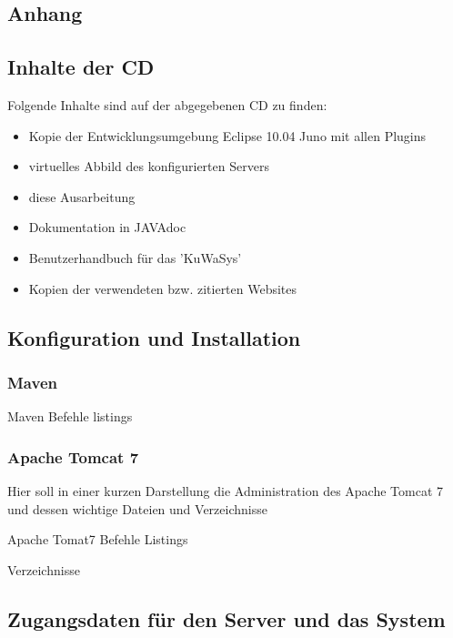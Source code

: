\documentclass[12pt, twoside, a4paper, ngerman]{article}
\begin{document}
\begin{appendix}
\section{Anhang}\label{sec:Anhang}

\subsection{Inhalte der CD}
Folgende Inhalte sind auf der abgegebenen CD zu finden:

\begin{itemize}
  \item Kopie der Entwicklungsumgebung Eclipse 10.04 Juno mit allen Plugins
  \item virtuelles Abbild des konfigurierten Servers
  \item diese Ausarbeitung
  \item Dokumentation in JAVAdoc
  \item Benutzerhandbuch für das 'KuWaSys'				%
  \item Kopien der verwendeten bzw. zitierten Websites 
\end{itemize}											%

\subsection{Konfiguration und Installation}

\subsubsection{Maven}

Maven Befehle listings

\subsubsection{Apache Tomcat 7}

Hier soll in einer kurzen Darstellung die Administration des Apache Tomcat 7 und dessen wichtige Dateien und Verzeichnisse 

\textbf{}
Apache Tomat7 Befehle Listings

Verzeichnisse

\subsection{Zugangsdaten für den Server und das System}


\end{appendix}
\end{document}
